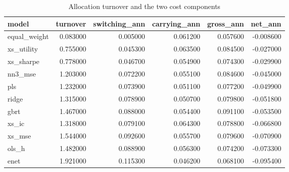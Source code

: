\begin{table}
\caption{Allocation turnover and the two cost components}
\label{tab:t3_turnover}
\begin{tabular}{lrrrrr}
\toprule
model & turnover & switching\_ann & carrying\_ann & gross\_ann & net\_ann \\
\midrule
equal\_weight & 0.083000 & 0.005000 & 0.061200 & 0.057600 & -0.008600 \\
xs\_utility & 0.755000 & 0.045300 & 0.063500 & 0.084500 & -0.027000 \\
xs\_sharpe & 0.778000 & 0.046700 & 0.054900 & 0.074300 & -0.029900 \\
nn3\_mse & 1.203000 & 0.072200 & 0.055100 & 0.084600 & -0.045000 \\
pls & 1.232000 & 0.073900 & 0.051100 & 0.077200 & -0.049900 \\
ridge & 1.315000 & 0.078900 & 0.050700 & 0.079800 & -0.051800 \\
gbrt & 1.467000 & 0.088000 & 0.054400 & 0.091100 & -0.053500 \\
xs\_ic & 1.318000 & 0.079100 & 0.064300 & 0.078800 & -0.066800 \\
xs\_mse & 1.544000 & 0.092600 & 0.055700 & 0.079600 & -0.070900 \\
ols\_h & 1.482000 & 0.088900 & 0.056300 & 0.074200 & -0.073300 \\
enet & 1.921000 & 0.115300 & 0.046200 & 0.068100 & -0.095400 \\
\bottomrule
\end{tabular}
\end{table}
